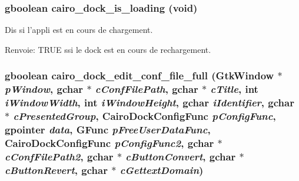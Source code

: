 \subsubsection{\setlength{\rightskip}{0pt plus 5cm}gboolean cairo\_\-dock\_\-is\_\-loading (void)}\label{cairo-dock-config_8h_e03d7453919e67aff991868dd71c2413}


Dis si l'appli est en cours de chargement. \begin{Desc}
\item[Renvoie:]TRUE ssi le dock est en cours de rechargement. \end{Desc}
\subsubsection{\setlength{\rightskip}{0pt plus 5cm}gboolean cairo\_\-dock\_\-edit\_\-conf\_\-file\_\-full (GtkWindow $\ast$ {\em pWindow}, gchar $\ast$ {\em cConfFilePath}, gchar $\ast$ {\em cTitle}, int {\em iWindowWidth}, int {\em iWindowHeight}, gchar {\em iIdentifier}, gchar $\ast$ {\em cPresentedGroup}, {\bf CairoDockConfigFunc} {\em pConfigFunc}, gpointer {\em data}, GFunc {\em pFreeUserDataFunc}, {\bf CairoDockConfigFunc} {\em pConfigFunc2}, gchar $\ast$ {\em cConfFilePath2}, gchar $\ast$ {\em cButtonConvert}, gchar $\ast$ {\em cButtonRevert}, gchar $\ast$ {\em cGettextDomain})}\label{cairo-dock-config_8h_dd9495916490fa41367914e6ca0ed982}


